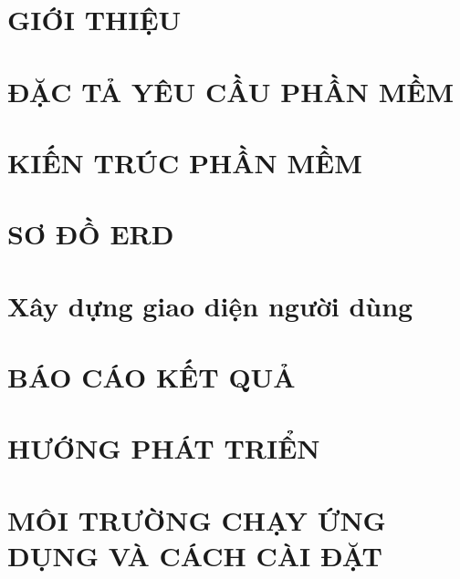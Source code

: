 \documentclass[a4paper,12pt]{report}
\begin{document}


\tableofcontents
\listoffigures
\newpage



\newpage

\chapter{GIỚI THIỆU}



\chapter{ĐẶC TẢ YÊU CẦU PHẦN MỀM}


\chapter{KIẾN TRÚC PHẦN MỀM}



\chapter{SƠ ĐỒ ERD}



\chapter{Xây dựng giao diện người dùng}


\chapter{BÁO CÁO KẾT QUẢ}


\chapter{HƯỚNG PHÁT TRIỂN}


\chapter{MÔI TRƯỜNG CHẠY ỨNG DỤNG VÀ CÁCH CÀI ĐẶT}

\end{document}
